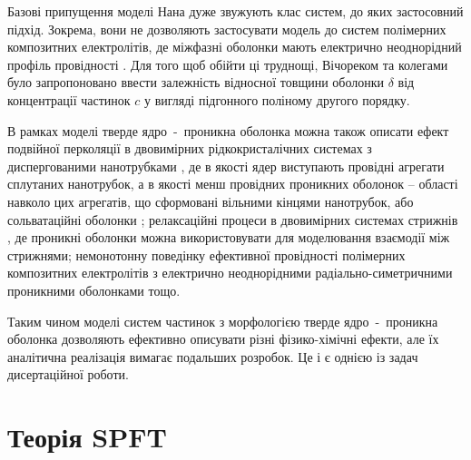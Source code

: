 \documentclass[14pt,twoside]{vakthesis}
\begin{document}
Базові припущення моделі Нана
дуже звужують клас систем, до яких застосовний підхід.
Зокрема, вони не дозволяють застосувати модель до систем полімерних композитних електролітів, де міжфазні оболонки мають електрично неоднорідний профіль провідності \cite{nanocomp2008}.
Для того щоб обійти ці труднощі, Вічореком та колегами~\cite{Wiec1989,Wiec1994,Przl1995} було запропоновано    ввести залежність відносної товщини оболонки $\delta$ від концентрації частинок $c$ у вигляді підгонного поліному другого порядку. 

В рамках моделі тверде ядро~-~проникна оболонка можна також описати ефект подвійної перколяції в двовимірних рідкокристалічних системах з диспергованими нанотрубками \cite{Tomylko2015, Lebovka2017}, де в якості ядер виступають провідні агрегати сплутаних нанотрубок, а в якості  менш провідних проникних оболонок -- області навколо цих агрегатів, що сформовані вільними кінцями нанотрубок, або сольватаційні оболонки \cite{Lebovka2017}; релаксаційні процеси в двовимірних системах стрижнів \cite{Lebovka2019}, де проникні оболонки можна використовувати для моделювання взаємодії між стрижнями; немонотонну поведінку ефективної провідності полімерних композитних електролітів з електрично неоднорідними радіально-симетричними проникними оболонками \cite{nanocomp2008} тощо. 

Таким чином моделі систем частинок з морфологією тверде ядро~-~проникна оболонка дозволяють ефективно описувати різні фізико-хімічні ефекти, але їх аналітична реалізація вимагає подальших розробок. Це і є однією із задач дисертаційної роботи.


\section{Теорія SPFT}\label{sec:SPFT}
\end{document}

